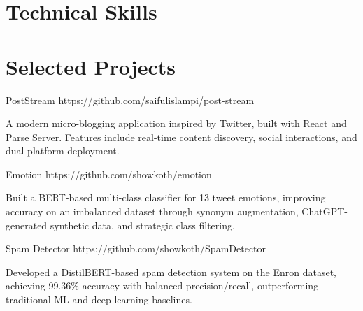 \documentclass{academic-cv}
\begin{document}
\section{Technical Skills}
\begin{cvskills}
\end{cvskills}

\section{Selected Projects}
\begin{cvprojects}
    \cvproject
        {PostStream}
        {https://github.com/saifulislampi/post-stream}
        \begin{cvitems}
            \item A modern micro-blogging application inspired by Twitter, built with React and Parse Server. Features include real-time content discovery, social interactions, and dual-platform deployment.
        \end{cvitems}
    \cvproject
        {Emotion}
        {https://github.com/showkoth/emotion}
        \begin{cvitems}
            \item Built a BERT-based multi-class classifier for 13 tweet emotions, improving accuracy on an imbalanced dataset through synonym augmentation, ChatGPT-generated synthetic data, and strategic class filtering.
        \end{cvitems}
    \cvproject
        {Spam Detector}
        {https://github.com/showkoth/SpamDetector}
        \begin{cvitems}
            \item Developed a DistilBERT-based spam detection system on the Enron dataset, achieving 99.36\% accuracy with balanced precision/recall, outperforming traditional ML and deep learning baselines.
        \end{cvitems}
\end{cvprojects}
\end{document}
